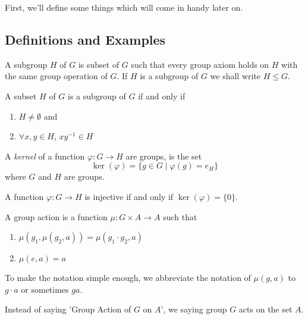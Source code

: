 First, we'll define some things which will come in handy later on.
\subsection{Definitions and Examples}

\begin{definition}
    A subgroup $H$ of $G$ is subset of $G$ such that every group axiom holds on $H$ with the same group operation of $G$.
    If $H$ is a subgroup of $G$ we shall write $H \le G$.
\end{definition}

\begin{proposition}
    A subset $H$ of $G$ is a subgroup of $G$ if and only if
    \begin{enumerate}
        \item $H \neq \emptyset$ and
        \item $\forall x,y \in H$, $xy^{-1} \in H$
    \end{enumerate}
\end{proposition}

\begin{definition}
    A \textit{kernel} of a function $\varphi : G \to H$ are groups, is the set 
    \[ \ker(\varphi) = \{ g \in G \mid \varphi(g)=e_H \} \]
    where $G$ and $H$ are groups.
\end{definition}

\begin{proposition}
    A function $\varphi : G \to H$ is injective if and only if 
    $\ker (\varphi) = \{0\} $.
\end{proposition}

\begin{definition}
    A group action is a function $\mu : G \times A \to A$ such that
    \begin{enumerate}
        \item $\mu(g_1, \mu(g_2,a))=\mu(g_1 \cdot g_2,a)$
        \item $\mu(e,a)=a$
    \end{enumerate}
    To make the notation simple enough, we abbreviate the notation of
    $\mu(g,a)$ to $g \cdot a$ or sometimes $ga$.    
\end{definition}

\begin{remark}
    Instead of saying 'Group Action of $G$ on $A$', we saying group $G$
    acts on the set $A$. 
\end{remark}

